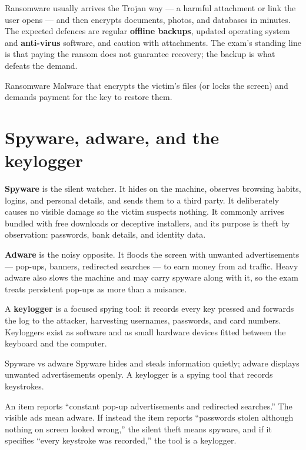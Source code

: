 Ransomware usually arrives the Trojan way --- a harmful attachment or link
the user opens --- and then encrypts documents, photos, and databases in
minutes. The expected defences are regular \textbf{offline backups}, updated
operating system and \textbf{anti-virus} software, and
caution with attachments. The exam's standing line is that paying the ransom
does not guarantee recovery; the backup is what defeats the demand.

\begin{definitionbox}{Ransomware}
Malware that encrypts the victim's files (or locks the screen) and demands
payment for the key to restore them.
\end{definitionbox}

\section{Spyware, adware, and the keylogger}
\textbf{Spyware} is the silent watcher. It hides on the machine, observes
browsing habits, logins, and personal details, and sends them to a third
party. It deliberately causes no visible damage so the victim suspects
nothing. It commonly arrives bundled with free downloads or deceptive
installers, and its purpose is theft by observation: passwords, bank
details, and identity data.

\textbf{Adware} is the noisy opposite. It floods the screen with unwanted
advertisements --- pop-ups, banners, redirected searches --- to earn money
from ad traffic. Heavy adware also slows the machine and may carry spyware
along with it, so the exam treats persistent pop-ups as more than a
nuisance.

A \textbf{keylogger} is a focused spying tool: it records every key pressed
and forwards the log to the attacker, harvesting usernames, passwords, and
card numbers. Keyloggers exist as software and as small hardware devices
fitted between the keyboard and the computer.

\begin{definitionbox}{Spyware vs adware}
Spyware hides and steals information quietly; adware displays unwanted
advertisements openly. A keylogger is a spying tool that records keystrokes.
\end{definitionbox}

\begin{example}
An item reports ``constant pop-up advertisements and redirected searches.''
The visible ads mean adware. If instead the item reports ``passwords stolen
although nothing on screen looked wrong,'' the silent theft means spyware,
and if it specifies ``every keystroke was recorded,'' the tool is a
keylogger.
\end{example}

